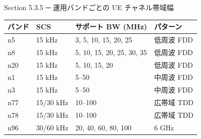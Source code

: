 \begin{frame}{Section 5.3.5 ─ 運用バンドごとの UE チャネル帯域幅}
\centering
\begin{tabular}{llll}
\toprule
バンド & SCS & サポート BW (MHz) & パターン \\
\midrule
n5  & 15 kHz       & 3, 5, 10, 15, 20, 25         & 低周波 FDD \\
n8  & 15 kHz       & 5, 10, 15, 20, 25, 30, 35    & 低周波 FDD \\
n20 & 15 kHz       & 5, 10, 15, 20                & 低周波 FDD \\
n1  & 15 kHz       & 5--50                        & 中周波 FDD \\
n3  & 15 kHz       & 5--50                        & 中周波 FDD \\
n77 & 15/30 kHz    & 10--100                      & 広帯域 TDD \\
n78 & 15/30 kHz    & 10--100                      & 広帯域 TDD \\
n96 & 30/60 kHz    & 20, 40, 60, 80, 100          & 6 GHz \\
\bottomrule
\end{tabular}
\end{frame}
